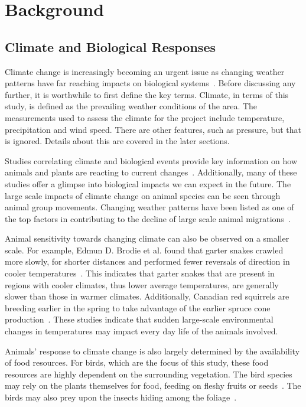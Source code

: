 

\chapter{Background}

\section{Climate and Biological Responses}

Climate change is increasingly becoming an urgent issue as changing weather patterns have far reaching impacts on biological systems~\cite{baum2009cascading}. Before discussing any further, it is worthwhile to first define the key terms. Climate, in terms of this study, is defined as the prevailing weather conditions of the area. The measurements used to assess the climate for the project include temperature, precipitation and wind speed. There are other features, such as pressure, but that is ignored. Details about this are covered in the later sections. 

Studies correlating climate and biological events provide key information on how animals and plants are reacting to current changes~\cite{bradshaw2006evolutionary, jump2005running}. Additionally, many of these studies offer a glimpse into biological impacts we can expect in the future. The large scale impacts of climate change on animal species can be seen through animal group movements. Changing weather patterns have been listed as one of the top factors in contributing to the decline of large scale animal migrations~\cite{wilcove2008going}. 

Animal sensitivity towards changing climate can also be observed on a smaller scale. For example, Edmun D. Brodie et al. found that garter snakes crawled more slowly, for shorter distances and performed fewer reversals of direction in cooler temperatures~\cite{d1999consistency}. This indicates that garter snakes that are present in regions with cooler climates, thus lower average temperatures, are generally slower than those in warmer climates. Additionally, Canadian red squirrels are breeding earlier in the spring to take advantage of the earlier spruce cone production~\cite{bradshaw2006evolutionary}. These studies indicate that sudden large-scale environmental changes in temperatures may impact every day life of the animals involved.

Animals' response to climate change is also largely determined by the availability of food resources. For birds, which are the focus of this study, these food resources are highly dependent on the surrounding vegetation. The bird species may rely on the plants themselves for food, feeding on fleshy fruits or seeds~\cite{bock1976synchronous}. The birds may also prey upon the insects hiding among the foliage~\cite{holmes1979bird}. 

